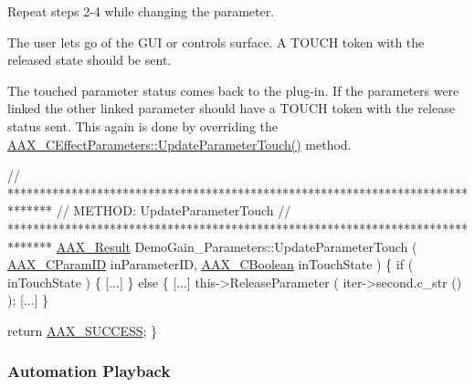 \begin{DoxyEnumerate}
\item Repeat steps 2-\/4 while changing the parameter.
\item The user lets go of the G\+U\+I or controls surface. A T\+O\+U\+C\+H token with the released state should be sent.
\begin{DoxyItemize}
\item The touched parameter status comes back to the plug-\/in. If the parameters were linked the other linked parameter should have a T\+O\+U\+C\+H token with the release status sent. This again is done by overriding the \hyperlink{a00018_a1555fe9834764330bd264941a1d6ebc3}{A\+A\+X\+\_\+\+C\+Effect\+Parameters\+::\+Update\+Parameter\+Touch()} method. 
\begin{DoxyCode}
\textcolor{comment}{// *******************************************************************************}
\textcolor{comment}{// METHOD:  UpdateParameterTouch}
\textcolor{comment}{// *******************************************************************************}
\hyperlink{a00149_a4d8f69a697df7f70c3a8e9b8ee130d2f}{AAX\_Result} DemoGain\_Parameters::UpdateParameterTouch ( \hyperlink{a00149_a1440c756fe5cb158b78193b2fc1780d1}{AAX\_CParamID} inParameterID, 
      \hyperlink{a00149_aa216506530f1d19a2965931ced2b274b}{AAX\_CBoolean} inTouchState )
\{
    \textcolor{keywordflow}{if} ( inTouchState )
    \{
        [...]
    \}
    \textcolor{keywordflow}{else}
    \{
        [...]
            this->ReleaseParameter ( iter->second.c\_str () );
        [...]
    \}

    \textcolor{keywordflow}{return} \hyperlink{a00207_a5f8c7439f3a706c4f8315a9609811937aeddbd1bb67e3a66e6af54a4b4a7a57b3}{AAX\_SUCCESS};
\}
\end{DoxyCode}

\end{DoxyItemize}
\end{DoxyEnumerate}\hypertarget{a00354_linkedParameters_linkedParameterOperation_automationPlayback}{}\subsubsection{Automation Playback}\label{a00354_linkedParameters_linkedParameterOperation_automationPlayback}

